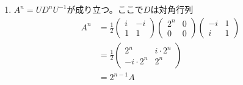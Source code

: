 \begin{souanswer}
\begin{enumerate}
\begin{equation*}
\end{equation*}
	これをみたすような$U$は$\frac{1}{\sqrt{2}}\begin{pmatrix}i& -i\\1& 1\end{pmatrix}$
	\item $A^n= UD^nU^{-1}$が成り立つ。ここで$D$は対角行列
\begin{align*}
	A^n
	&= \frac{1}{2}\begin{pmatrix}i& -i\\ 1& 1\end{pmatrix}\begin{pmatrix}2^n& 0\\ 0& 0\end{pmatrix}\begin{pmatrix}-i& 1\\ i& 1\end{pmatrix}\\
	&= \frac{1}{2}\begin{pmatrix}2^n& i\cdot 2^n\\ -i\cdot 2^n& 2^n\end{pmatrix}\\
	&= 2^{n- 1}A
\end{align*}
\end{enumerate}
\end{souanswer}